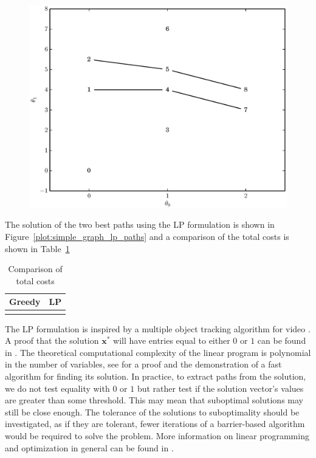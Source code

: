 \begin{figure}[!t]
    \centering
    \includegraphics[width=\figwidthscale\textwidth]{plots/small_graph_ex_lp_paths.eps}
    \CaptionWithTitle{%
    }{\label{plot:simple_graph_lp_paths}}
\end{figure}

The solution of the two best paths using the LP formulation
is shown in Figure~\ref{plot:simple_graph_lp_paths} and a comparison of the
total costs is shown in Table~\ref{tab:greedy_lp_cost_compare}

\begin{table}
    \caption{\label{tab:greedy_lp_cost_compare} Comparison of total costs}
    \begin{center}
        \begin{tabular}{c c}
            Greedy & LP \\
            \hline
             &
             \\
        \end{tabular}
    \end{center}
\end{table}

The LP formulation is inspired by a multiple object tracking algorithm for video
\cite{jiang2007linear}. A proof that the solution $\boldsymbol{x}^{\ast}$ will
have entries equal to either $0$ or $1$ can be found in
\cite[p.~167]{parker1988discrete}. The theoretical computational complexity of
the linear program is polynomial in the number of variables, see
\cite{karmarkar1984new} for a proof and the demonstration of a fast algorithm
for finding its solution. In practice, to extract paths from the solution, we do
not test equality with $0$ or $1$ but rather test if the solution vector's
values are greater than some threshold. This may mean that suboptimal solutions
may still be close enough. The tolerance of the solutions to suboptimality
should be investigated, as if they are tolerant, fewer iterations of a
barrier-based algorithm would be required to solve the problem. More information
on linear programming and optimization in general can be found in
\cite{boyd2004convex}.

